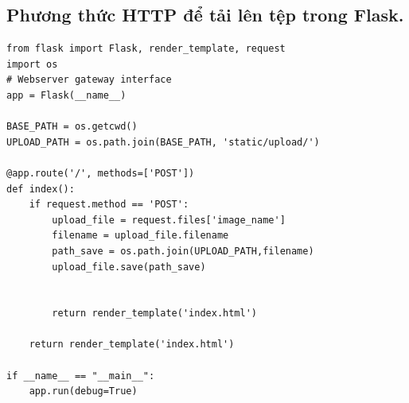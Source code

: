 \documentclass{article}
\begin{document}
\subsection{Phương thức HTTP để tải lên tệp trong Flask.}
\begin{verbatim}
from flask import Flask, render_template, request
import os
# Webserver gateway interface
app = Flask(__name__)

BASE_PATH = os.getcwd()
UPLOAD_PATH = os.path.join(BASE_PATH, 'static/upload/')

@app.route('/', methods=['POST'])
def index():
    if request.method == 'POST':
        upload_file = request.files['image_name']
        filename = upload_file.filename
        path_save = os.path.join(UPLOAD_PATH,filename)
        upload_file.save(path_save)


        return render_template('index.html')

    return render_template('index.html')

if __name__ == "__main__":
    app.run(debug=True)
\end{verbatim}
\end{document}
